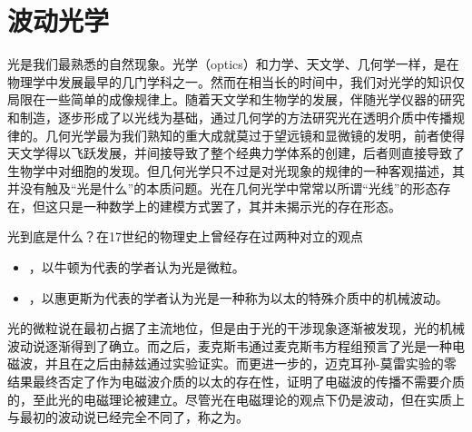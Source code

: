 \chapter{波动光学}
\label{chap:波动光学}
光是我们最熟悉的自然现象。光学（optics）和力学、天文学、几何学一样，是在物理学中发展最早的几门学科之一。然而在相当长的时间中，我们对光学的知识仅局限在一些简单的成像规律上。随着天文学和生物学的发展，伴随光学仪器的研究和制造，逐步形成了以光线为基础，通过几何学的方法研究光在透明介质中传播规律的。几何光学最为我们熟知的重大成就莫过于望远镜和显微镜的发明，前者使得天文学得以飞跃发展，并间接导致了整个经典力学体系的创建，后者则直接导致了生物学中对细胞的发现。但几何光学只不过是对光现象的规律的一种客观描述，其并没有触及“光是什么”的本质问题。光在几何光学中常常以所谓“光线”的形态存在，但这只是一种数学上的建模方式罢了，其并未揭示光的存在形态。

光到底是什么？在17世纪的物理史上曾经存在过两种对立的观点
\begin{itemize}
    \item {}，以牛顿为代表的学者认为光是微粒。
    \item {}，以惠更斯为代表的学者认为光是一种称为以太的特殊介质中的机械波动。
\end{itemize}
光的微粒说在最初占据了主流地位，但是由于光的干涉现象逐渐被发现，光的机械波动说逐渐得到了确立。而之后，麦克斯韦通过麦克斯韦方程组预言了光是一种电磁波，并且在之后由赫兹通过实验证实。而更进一步的，迈克耳孙-莫雷实验的零结果最终否定了作为电磁波介质的以太的存在性，证明了电磁波的传播不需要介质的，至此光的电磁理论被建立。尽管光在电磁理论的观点下仍是波动，但在实质上与最初的波动说已经完全不同了，称之为。







